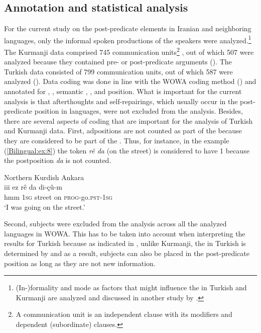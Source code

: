 \documentclass[output=paper,colorlinks,citecolor=brown]{langscibook}
\begin{document}
\subsection{Annotation and statistical analysis}\label{bilingual:ss:5.3}

For the current study on the post-predicate elements in Iranian and neighboring languages, only the informal spoken productions of the speakers were analyzed.\footnote{(In-)formality and mode as factors that might influence the  in Turkish and Kurmanji are analyzed and discussed in another study by \citet{iefremenko2023wordorder}.} The Kurmanji data comprised 745 communication units\footnote{A communication unit is an independent clause with its modifiers and dependent (subordinate) clauses.} , out of which 507 were analyzed because they contained pre- or post-predicate arguments (\citealt{iefremenko2021KurdishAnkara}). The Turkish data consisted of 799 communication units, out of which 587 were analyzed (\citealt{iefremenko2021oghuz}). Data coding was done in line with the WOWA coding method () and annotated for , , semantic , , and position. What is important for the current analysis is that afterthoughts and self-repairings, which usually occur in the post-predicate position in  languages, were not excluded from the analysis. Besides, there are several aspects of coding that are important for the analysis of Turkish and Kurmanji data. First, adpositions are not counted as part of the  because they are considered to be part of the . Thus, for instance, in the example (\ref{Bilingual:ex:8}) the token \textit{rê da} (on the street) is considered to have  1 because the postposition \textit{da} is not counted.

\ea\label{Bilingual:ex:8}
Northern Kurdish Ankara \citep[A, 3]{iefremenko2021KurdishAnkara} \\
\gll iii ez rê da di-çû-m \\
hmm \textsc{1sg} street on \textsc{prog-}go\textsc{.pst-1sg} \\
\glt `I was going on the street.' 
\z

Second, subjects were excluded from the analysis across all the analyzed languages in WOWA. This has to be taken into account when interpreting the results for Turkish because as indicated in , unlike Kurmanji, the  in Turkish is determined by  and as a result, subjects can also be placed in the post-predicate position as long as they are not new information.
\end{document}
